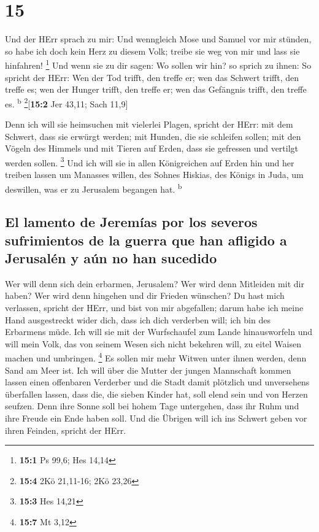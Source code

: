 \hypertarget{section-14}{%
\section{15}\label{section-14}}

 Und der HErr sprach zu mir: Und wenngleich Mose und
Samuel vor mir stünden, so habe ich doch kein Herz zu diesem Volk;
treibe sie weg von mir und lass sie hinfahren! \footnote{\textbf{15:1}
  Ps 99,6; Hes 14,14}  Und wenn sie zu dir sagen: Wo
sollen wir hin? so sprich zu ihnen: So spricht der HErr: Wen der Tod
trifft, den treffe er; wen das Schwert trifft, den treffe es; wen der
Hunger trifft, den treffe er; wen das Gefängnis trifft, den treffe es.
\textsuperscript{b} \footnote{\textbf{15:4} 2Kö 21,11-16; 2Kö 23,26}{[}\textbf{15:2}
Jer 43,11; Sach 11,9{]}

 Denn ich will sie heimsuchen mit vielerlei Plagen,
spricht der HErr: mit dem Schwert, dass sie erwürgt werden; mit Hunden,
die sie schleifen sollen; mit den Vögeln des Himmels und mit Tieren auf
Erden, dass sie gefressen und vertilgt werden sollen. \footnote{\textbf{15:3}
  Hes 14,21}  Und ich will sie in allen Königreichen auf
Erden hin und her treiben lassen um Manasses willen, des Sohnes Hiskias,
des Königs in Juda, um deswillen, was er zu Jerusalem begangen hat.
\textsuperscript{b}

\hypertarget{el-lamento-de-jeremuxedas-por-los-severos-sufrimientos-de-la-guerra-que-han-afligido-a-jerusaluxe9n-y-auxfan-no-han-sucedido}{%
\subsection{El lamento de Jeremías por los severos sufrimientos de la
guerra que han afligido a Jerusalén y aún no han
sucedido}\label{el-lamento-de-jeremuxedas-por-los-severos-sufrimientos-de-la-guerra-que-han-afligido-a-jerusaluxe9n-y-auxfan-no-han-sucedido}}

 Wer will denn sich dein erbarmen, Jerusalem? Wer wird
denn Mitleiden mit dir haben? Wer wird denn hingehen und dir Frieden
wünschen?  Du hast mich verlassen, spricht der HErr, und
bist von mir abgefallen; darum habe ich meine Hand ausgestreckt wider
dich, dass ich dich verderben will; ich bin des Erbarmens müde.
 Ich will sie mit der Wurfschaufel zum Lande hinausworfeln
und will mein Volk, das von seinem Wesen sich nicht bekehren will, zu
eitel Waisen machen und umbringen. \footnote{\textbf{15:7} Mt 3,12}
 Es sollen mir mehr Witwen unter ihnen werden, denn Sand
am Meer ist. Ich will über die Mutter der jungen Mannschaft kommen
lassen einen offenbaren Verderber und die Stadt damit plötzlich und
unversehens überfallen lassen,  dass die, die sieben
Kinder hat, soll elend sein und von Herzen seufzen. Denn ihre Sonne soll
bei hohem Tage untergehen, dass ihr Ruhm und ihre Freude ein Ende haben
soll. Und die Übrigen will ich ins Schwert geben vor ihren Feinden,
spricht der HErr.

